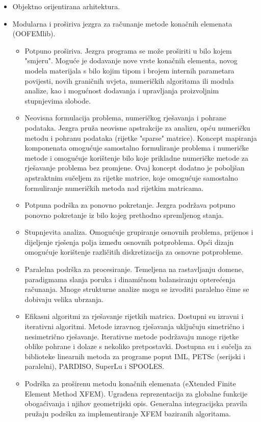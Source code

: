\documentclass[a4paper,twoside,12pt]{memoir} %
\begin{document}
\begin{itemize}
    \item Objektno orijentirana arhitektura.
    \item Modularna i proširiva jezgra za računanje metode konačnih elemenata (OOFEMlib).
    \begin{itemize}
        \item Potpuno proširiva. Jezgra programa se može proširiti u bilo kojem "smjeru". Moguće je dodavanje nove vrste konačnih elementa, novog modela materijala s bilo kojim tipom i brojem internih parametara povijesti, novih graničnih uvjeta, numeričkih algoritama ili modula analize, kao i mogućnost dodavanja i upravljanja proizvoljnim stupnjevima slobode.
        \item Neovisna formulacija problema, numeričkog rješavanja i pohrane podataka. Jezgra pruža neovisne apstrakcije za analizu, opću numeričku metodu i pohranu podataka (rijetke "sparse" matrice). Koncept mapiranja komponenata omogućuje samostalno formuliranje problema i numeričke metode i omogućuje korištenje bilo koje prikladne numeričke metode za rješavanje problema bez promjene. Ovaj koncept dodatno je poboljšan apstraktnim sučeljem za rijetke matrice, koje omogućuje samostalno formuliranje numeričkih metoda nad rijetkim matricama.
        \item Potpuna podrška za ponovno pokretanje. Jezgra podržava potpuno ponovno pokretanje iz bilo kojeg prethodno spremljenog stanja.
        \item Stupnjevita analiza. Omogućuje grupiranje osnovnih problema, prijenos i dijeljenje rješenja polja između osnovnih potproblema. Opći dizajn omogućuje korištenje različitih diskretizacija za osnovne potprobleme.
        \item Paralelna podrška za procesiranje. Temeljena na rastavljanju domene, paradigmama slanja poruka i dinamičnom balansiranju opterećenja računanja. Mnoge strukturne analize mogu se izvoditi paralelno čime se dobivaju velika ubrzanja.
        \item Efikasni algoritmi za rješavanje rijetkih matrica. Dostupni su izravni i iterativni algoritmi. Metode izravnog rješavanja uključuju simetrično i nesimetrično rješavanje. Iterativne metode podržavaju mnoge rijetke oblike pohrane i dolaze s nekoliko pretpostavki. Dostupna su i sučelja za biblioteke linearnih metoda za programe poput IML, PETSc (serijski i paralelni), PARDISO, SuperLu i SPOOLES.
        \item Podrška za proširenu metodu konačnih elemenata (eXtended Finite Element Method XFEM). Ugrađena reprezentacija za globalne funkcije obogaćivanja i njihov geometrijski opis. Generalna integracijska pravila pružaju podršku za implementiranje XFEM baziranih algoritama.

\end{itemize}
\end{itemize}
\end{document}
